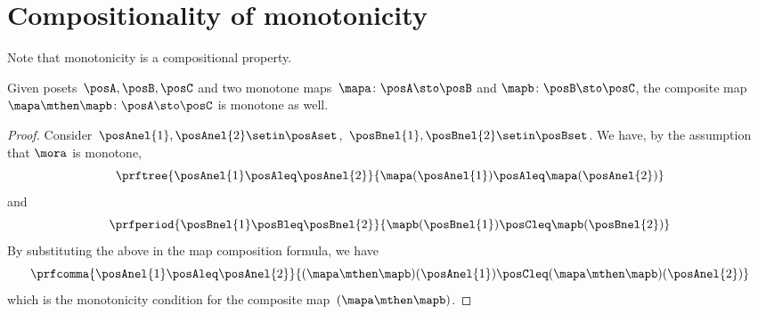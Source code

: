 
\section{Compositionality of monotonicity}
Note that monotonicity is a compositional property.
\begin{lemma}
    Given posets~$\posA,\posB,\posC$ and two monotone maps~$\mapa\colon \posA \sto \posB$ and $\mapb\colon \posB \sto \posC$, the composite map~$\mapa\mthen \mapb\colon \posA \sto \posC$ is monotone as well.
\end{lemma}
\begin{proof}
    Consider~$\posAnel{1},\posAnel{2} \setin \posAset$,~$\posBnel{1},\posBnel{2}\setin \posBset$.
    We have, by the assumption that $\mora$ is monotone,
    \begin{equation}
        \prftree{\posAnel{1}\posAleq \posAnel{2}}{\mapa(\posAnel{1})\posAleq \mapa(\posAnel{2})}
    \end{equation}
    and
    \begin{equation}
        \prfperiod{\posBnel{1}\posBleq \posBnel{2}}{\mapb(\posBnel{1})\posCleq \mapb(\posBnel{2})}
    \end{equation}
    By substituting the above in the map composition formula, we have
    \begin{equation}
        \prfcomma{\posAnel{1}\posAleq \posAnel{2} }{ (\mapa\mthen \mapb)(\posAnel{1}) \posCleq (\mapa\mthen \mapb)(\posAnel{2})}
    \end{equation}
    which is the monotonicity condition for the composite map~$(\mapa\mthen\mapb)$.
\end{proof}
